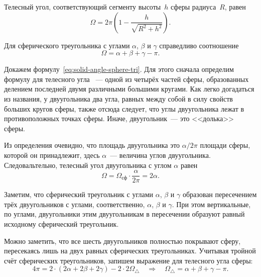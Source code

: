 Телесный угол, соответствующий сегменту высоты~$h$ сферы радиуса~$R$, равен
\begin{equation}
	\Omega = 2 \pi \left(1 - \dfrac{h}{\sqrt{R^2 + h^2}}\right).
\end{equation}

Для сферического треугольника с углами $\alpha$, $\beta$ и $\gamma$ справедливо соотношение
\begin{equation}
	\Omega = \alpha + \beta + \gamma - \pi. \label{eq:solid-angle-sphere-tri}
\end{equation}

Докажем формулу~\eqref{eq:solid-angle-sphere-tri}. Для этого сначала определим формулу для телесного угла ~--- одной из четырёх частей сферы, образованных делением последней двумя различными большими кругами. Как легко догадаться из названия, у двуугольника два угла, равных между собой в силу свойств больших кругов сферы, также отсюда следует, что углы двуугольника лежат в противоположных точках сферы. Иначе, двуугольник~--- это <<долька>> сферы. 

Из определения очевидно, что площадь двуугольника это $\alpha/ 2\pi$ площади сферы, которой он принадлежит, здесь $\alpha$~--- величина углов двуугольника. Следовальтельно, телесный угол двуугольника с углом $\alpha$ равен \begin{equation*}
     \Omega = \Omega_\text{сф} \cdot \frac{\alpha}{2 \pi} = 2 \alpha.
 \end{equation*}
 
 Заметим, что сферический треугольник с углами $\alpha$, $\beta$ и $\gamma$ образован пересечением трёх двуугольников с углами, соответственно, $\alpha$, $\beta$ и $\gamma$. При этом вертикальные, по углами, двуугольники этим двуугольникам в пересечении образуют равный исходному сферический треугольник. 
 
 Можно заметить, что все шесть двуугольников полностью покрывают сферу, пересекаясь лишь на двух равных сферических треугольниках. Учитывая тройной счёт сферических треугольников, запишем выражение для телесного угла сферы:
 \begin{equation*}
     4\pi = 2 \cdot (2 \alpha +2 \beta + 2 \gamma) - 2 \cdot 2 \Omega_\triangle \quad \Rightarrow \quad \Omega_\triangle = \alpha + \beta + \gamma - \pi.
 \end{equation*}













